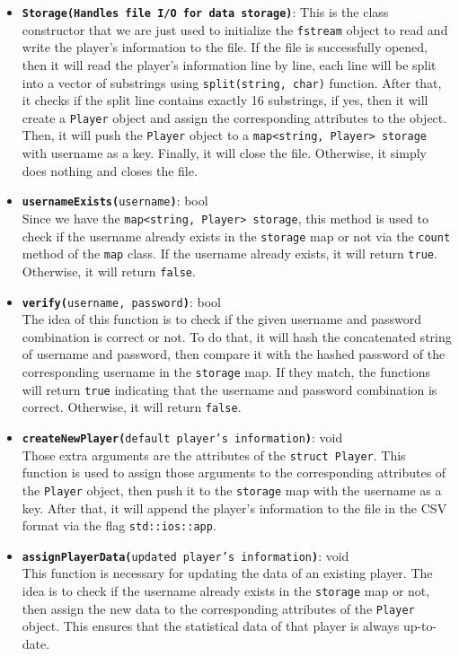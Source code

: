 \begin{enumerate}
\begin{itemize}
        \item \textbf{\texttt{Storage(Handles file I/O for data storage)}}: This is the class constructor that we are just used to initialize the \texttt{fstream} object to read and write the player's information to the file. If the file is successfully opened, then it will read the player's information line by line, each line will be split into a vector of substrings using \texttt{split(string, char)} function. After that, it checks if the split line contains exactly 16 substrings, if yes, then it will create a \texttt{Player} object and assign the corresponding attributes to the object. Then, it will push the \texttt{Player} object to a \texttt{map<string, Player> storage} with username as a key. Finally, it will close the file. Otherwise, it simply does nothing and closes the file.
        \item \texttt{\textbf{usernameExists(}username\textbf{)}}: bool \\ Since we have the \texttt{map<string, Player> storage}, this method is used to check if the username already exists in the \texttt{storage} map or not via the \texttt{count} method of the \texttt{map} class. If the username already exists, it will return \texttt{true}. Otherwise, it will return \texttt{false}.
        \item \texttt{\textbf{verify(}username, password\textbf{)}}: bool \\ The idea of this function is to check if the given username and password combination is correct or not. To do that, it will hash the concatenated string of username and password, then compare it with the hashed password of the corresponding username in the \texttt{storage} map. If they match, the functions will return \texttt{true} indicating that the username and password combination is correct. Otherwise, it will return \texttt{false}.
        \item \texttt{\textbf{createNewPlayer(}default player's information\textbf{)}}: void \\ Those extra arguments are the attributes of the \texttt{struct Player}. This function is used to assign those arguments to the corresponding attributes of the \texttt{Player} object, then push it to the \texttt{storage} map with the username as a key. After that, it will append the player's information to the file in the CSV format via the flag \texttt{std::ios::app}.
        \item \texttt{\textbf{assignPlayerData(}updated player's information\textbf{)}}: void \\ This function is necessary for updating the data of an existing player. The idea is to check if the username already exists in the \texttt{storage} map or not, then assign the new data to the corresponding attributes of the \texttt{Player} object. This ensures that the statistical data of that player is always up-to-date.

\end{itemize}
\end{enumerate}
